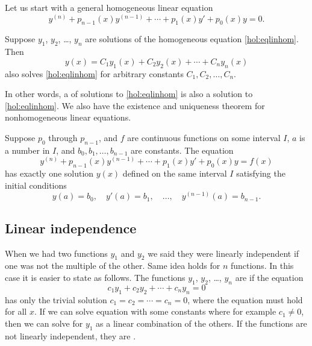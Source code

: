 \documentclass[12pt]{book}
\begin{document}
Let us start with a general homogeneous linear equation
\begin{equation} \label{hol:eqlinhom}
y^{(n)} + p_{n-1}(x)y^{(n-1)} + \cdots + p_1(x) y' + p_0(x) y = 0 .
\end{equation}

\begin{theorem}[Superposition]
Suppose $y_1$, $y_2$, \ldots, $y_n$ are solutions of the
homogeneous equation \eqref{hol:eqlinhom}.  Then 
\begin{equation*}
y(x) = C_1 y_1(x) + C_2 y_2(x) + \cdots + C_n y_n(x) 
\end{equation*}
also solves \eqref{hol:eqlinhom}
for arbitrary constants $C_1, C_2, \ldots, C_n$.
\end{theorem}

In other words, a \emph{} of solutions
to \eqref{hol:eqlinhom}
is also a solution to \eqref{hol:eqlinhom}.
We also have the existence and uniqueness theorem for nonhomogeneous linear
equations.

\begin{theorem}
Suppose $p_0$ through $p_{n-1}$, and $f$ are continuous functions
on some interval $I$,
$a$ is a number in $I$,
and $b_0, b_1, \ldots, b_{n-1}$ are constants.
The equation
\begin{equation*} %
y^{(n)} + p_{n-1}(x)y^{(n-1)} + \cdots + p_1(x) y' + p_0(x) y = f(x) 
\end{equation*}
has exactly one solution $y(x)$ defined on the same interval $I$
satisfying the initial conditions
\begin{equation*}
y(a) = b_0, \quad y'(a) = b_1, \quad \ldots, \quad y^{(n-1)}(a) = b_{n-1} .
\end{equation*}
\end{theorem}

\subsection{Linear independence}

When we had two functions $y_1$ and $y_2$ we said they were linearly
independent if one was not the multiple of the other.  Same idea holds for
$n$ functions.  In this case it is easier to state as follows. The functions
$y_1$, $y_2$, \ldots, $y_n$ are \emph{} if
the equation
\begin{equation*}
c_1 y_1 + c_2 y_2 + \cdots + c_n y_n = 0 
\end{equation*}
has only the trivial solution $c_1 = c_2 = \cdots = c_n = 0$, where the
equation must hold for all $x$.  If we can
solve equation with some constants where for example $c_1 \not= 0$, then we
can solve for $y_1$ as a linear combination of the others.  If the functions
are not
linearly independent, they are \emph{}.
\end{document}
